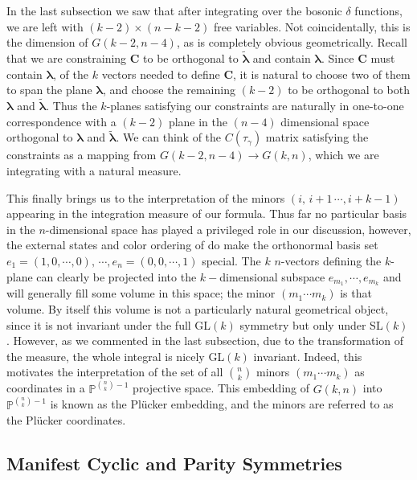 \documentclass[12pt]{article}
\begin{document}
In the last subsection we saw that after integrating over the bosonic $\delta$ functions, we are left with $(k-2)\times (n- k - 2)$ free
variables. Not coincidentally, this is the dimension of $G(k-2,n-4)$, as is completely obvious geometrically. Recall that we are constraining $\boldsymbol{C}$ to be orthogonal to $ \boldsymbol{\tilde \lambda}$ and contain $\boldsymbol{\lambda}$. Since $\boldsymbol{C}$ must contain $\boldsymbol\lambda$, of the $k$ vectors needed to define $\boldsymbol{C}$, it is natural to choose two of them to span the plane $\boldsymbol{\lambda}$, and choose the remaining $(k-2)$ to be orthogonal to both $\boldsymbol{\lambda}$ and $\boldsymbol{\tilde \lambda}$. Thus the $k$-planes satisfying our constraints are naturally in one-to-one correspondence with a $(k-2)$ plane in the $(n-4)$ dimensional space orthogonal to $\boldsymbol{\lambda}$ and $\boldsymbol{\tilde \lambda}$. We can think of the $C(\tau_\gamma)$ matrix satisfying the constraints as a mapping from $G(k-2,n-4) \to G(k,n)$, which we are integrating with a natural measure.

This finally brings us to the interpretation of the minors $(i, \,
i+1 \, \cdots, i + k -1)$ appearing in the integration measure of
our formula. Thus far no particular basis in the $n$-dimensional
space has played a privileged role in our discussion, however, the
external states and color ordering of do make the orthonormal basis
set $e_1 = (1, 0, \cdots, 0), \, \cdots, e_n = (0, 0, \cdots, 1)$
special. The $k$ $n$-vectors defining the $k$-plane can clearly be
projected into the $k-$dimensional subspace $e_{m_1}, \cdots,
e_{m_k}$ and will generally fill some volume in this space; the
minor $(m_1 \cdots m_k)$ is  that volume. By itself this volume is
not a particularly natural geometrical object, since it is not
invariant under the full GL$(k)$ symmetry but only under SL$(k)$.
However, as we commented in the last subsection, due to the
transformation of the measure, the whole integral is nicely GL$(k)$
invariant. Indeed, this motivates the interpretation of the set of
all $n \choose k$ minors $(m_1 \cdots m_k)$ as coordinates in a
$\mathbb{P}^{{n \choose k} -1}$ projective space. This embedding of
$G(k,n)$ into $\mathbb{P}^{{n \choose k} - 1}$ is known as the
Pl\"{u}cker embedding, and the minors are referred to as the
Pl\"{u}cker coordinates.

\subsection{Manifest Cyclic and Parity Symmetries}
\end{document}
